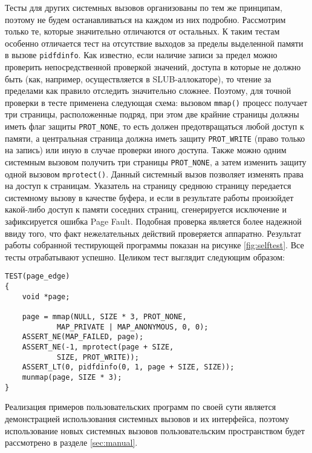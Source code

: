 Тесты для других системных вызовов организованы по тем же принципам, поэтому не
будем останавливаться на каждом из них подробно. Рассмотрим только те, которые
значительно отличаются от остальных. К таким тестам особенно отличается тест на
отсутствие выходов за пределы выделенной памяти в вызове \texttt{pidfdinfo}. Как
известно, если наличие записи за предел можно проверить непосредственной
проверкой значений, доступа в которые не должно быть (как, например,
осуществляется в SLUB-аллокаторе), то чтение за пределами как правило отследить
значительно сложнее. Поэтому, для точной проверки в тесте применена следующая
схема: вызовом \texttt{mmap()} процесс получает три страницы, расположенные
подряд, при этом две крайние страницы должны иметь флаг защиты
\texttt{PROT\_NONE}, то есть должен предотвращаться любой доступ к памяти, а
центральная страница должна иметь защиту \texttt{PROT\_WRITE} (право только на
запись) или иную в случае проверки иного доступа. Также можно одним системным
вызовом получить три страницы \texttt{PROT\_NONE}, а затем изменить защиту одной
вызовом \texttt{mprotect()}. Данный системный вызов позволяет изменять права на
доступ к страницам. Указатель на страницу среднюю
страницу передается системному вызову в качестве буфера, и если в результате
работы произойдет какой-либо доступ к памяти соседних страниц, сгенерируется
исключение и зафиксируется ошибка Page Fault. Подобная проверка является более
надежной ввиду того, что факт нежелательных действий проверяется аппаратно.
Результат работы собранной тестирующей программы показан на рисунке
\ref{fig:selftest}. Все тесты отрабатывают успешно. Целиком тест выглядит
следующим образом:
\medskip
\begin{lstlisting}[style=cstyle]
TEST(page_edge)
{
	void *page;

	page = mmap(NULL, SIZE * 3, PROT_NONE,
			MAP_PRIVATE | MAP_ANONYMOUS, 0, 0);
	ASSERT_NE(MAP_FAILED, page);
	ASSERT_NE(-1, mprotect(page + SIZE,
			SIZE, PROT_WRITE));
	ASSERT_LT(0, pidfdinfo(0, 1, page + SIZE, SIZE));
	munmap(page, SIZE * 3);
}
\end{lstlisting}
\medskip

Реализация примеров пользовательских программ по своей сути является
демонстрацией использования системных вызовов и их интерфейса, поэтому
использование новых системных вызовов пользовательским пространством будет
рассмотрено в разделе \ref{sec:manual}.
